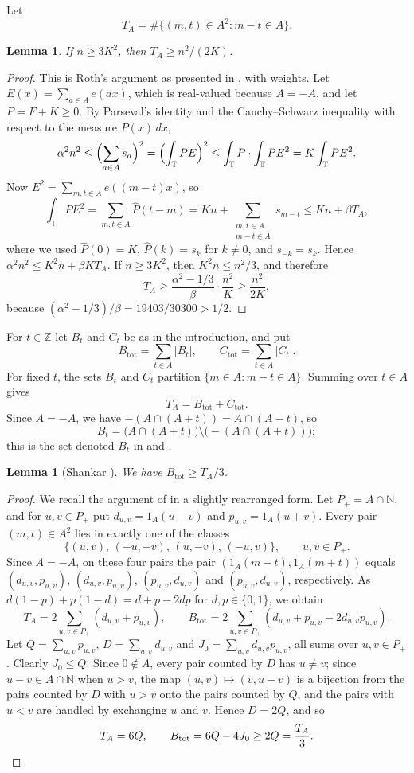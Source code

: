 \documentclass{amsart}
\newtheorem{lemma}[theorem]{Lemma}
\theoremstyle{remark}
\numberwithin{equation}{section}
\numberwithin{table}{section}
\newcommand{\T}{\mathbb{T}}
\newcommand{\Z}{\mathbb{Z}}
\newcommand{\N}{\mathbb{N}}
\newcommand{\Btot}{B_{\mathrm{tot}}}
\newcommand{\Ctot}{C_{\mathrm{tot}}}
\begin{document}
Let
\[
T_A=\#\{(m,t)\in A^2:m-t\in A\}.
\]

\begin{lemma}\label{lem:roth}
If $n\ge3K^2$, then $T_A\ge n^2/(2K)$.
\end{lemma}

\begin{proof}
This is Roth's argument \cite{Rot} as presented in \cite[Lemma~4.1]{Bed}, with weights. Let $E(x)=\sum_{a\in A}e(ax)$, which is real-valued because $A=-A$, and let $P=F+K\ge0$. By Parseval's identity and the Cauchy--Schwarz inequality with respect to the measure $P(x)\,dx$,
\[
\alpha^2n^2\le\Bigl(\sum_{a\in A}s_a\Bigr)^2=\Bigl(\int_\T PE\Bigr)^2\le\int_\T P\cdot\int_\T PE^2=K\int_\T PE^2.
\]
Now $E^2=\sum_{m,t\in A}e((m-t)x)$, so
\[
\int_\T PE^2=\sum_{m,t\in A}\widehat P(t-m)=Kn+\sum_{\substack{m,t\in A\\ m-t\in A}}s_{m-t}\le Kn+\beta T_A,
\]
where we used $\widehat P(0)=K$, $\widehat P(k)=s_k$ for $k\ne0$, and $s_{-k}=s_k$. Hence $\alpha^2n^2\le K^2n+\beta KT_A$. If $n\ge3K^2$, then $K^2n\le n^2/3$, and therefore
\[
T_A\ge\frac{\alpha^2-1/3}{\beta}\cdot\frac{n^2}{K}\ge\frac{n^2}{2K},
\]
because $(\alpha^2-1/3)/\beta=19403/30300>1/2$.
\end{proof}

For $t\in\Z$ let $B_t$ and $C_t$ be as in the introduction, and put
\[
\Btot=\sum_{t\in A}|B_t|,\qquad\Ctot=\sum_{t\in A}|C_t|.
\]
For fixed $t$, the sets $B_t$ and $C_t$ partition $\{m\in A:m-t\in A\}$. Summing over $t\in A$ gives
\begin{equation}\label{eq:TBC}
T_A=\Btot+\Ctot.
\end{equation}
Since $A=-A$, we have $-(A\cap(A+t))=A\cap(A-t)$, so
\[
B_t=\bigl(A\cap(A+t)\bigr)\setminus\bigl(-(A\cap(A+t))\bigr);
\]
this is the set denoted $B_t$ in \cite{Bed} and \cite{Sha}.

\begin{lemma}[Shankar {\cite[Lemma~3.1]{Sha}}]\label{lem:shankar}
We have $\Btot\ge T_A/3$.
\end{lemma}

\begin{proof}
We recall the argument of \cite{Sha} in a slightly rearranged form. Let $P_+=A\cap\N$, and for $u,v\in P_+$ put $d_{u,v}=1_A(u-v)$ and $p_{u,v}=1_A(u+v)$. Every pair $(m,t)\in A^2$ lies in exactly one of the classes
\[
\{(u,v),\,(-u,-v),\,(u,-v),\,(-u,v)\},\qquad u,v\in P_+.
\]
Since $A=-A$, on these four pairs the pair $(1_A(m-t),1_A(m+t))$ equals $(d_{u,v},p_{u,v})$, $(d_{u,v},p_{u,v})$, $(p_{u,v},d_{u,v})$ and $(p_{u,v},d_{u,v})$, respectively. As $d(1-p)+p(1-d)=d+p-2dp$ for $d,p\in\{0,1\}$, we obtain
\[
T_A=2\sum_{u,v\in P_+}(d_{u,v}+p_{u,v}),\qquad\Btot=2\sum_{u,v\in P_+}(d_{u,v}+p_{u,v}-2d_{u,v}p_{u,v}).
\]
Let $Q=\sum_{u,v}p_{u,v}$, $D=\sum_{u,v}d_{u,v}$ and $J_0=\sum_{u,v}d_{u,v}p_{u,v}$, all sums over $u,v\in P_+$. Clearly $J_0\le Q$. Since $0\notin A$, every pair counted by $D$ has $u\ne v$; since $u-v\in A\cap\N$ when $u>v$, the map $(u,v)\mapsto(v,u-v)$ is a bijection from the pairs counted by $D$ with $u>v$ onto the pairs counted by $Q$, and the pairs with $u<v$ are handled by exchanging $u$ and $v$. Hence $D=2Q$, and so
\[
T_A=6Q,\qquad\Btot=6Q-4J_0\ge2Q=\frac{T_A}{3}.\qedhere
\]
\end{proof}
\end{document}
